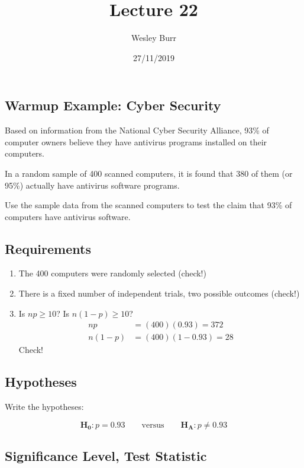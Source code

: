 \documentclass[]{article}
\title{Lecture 22}
\author{Wesley Burr}
\date{27/11/2019}
\providecommand{\tightlist}{%
  \setlength{\itemsep}{0pt}\setlength{\parskip}{0pt}}
\begin{document}
\maketitle

\hypertarget{warmup-example-cyber-security}{%
\subsection{Warmup Example: Cyber
Security}\label{warmup-example-cyber-security}}

Based on information from the National Cyber Security Alliance, 93\% of
computer owners believe they have antivirus programs installed on their
computers.

In a random sample of 400 scanned computers, it is found that 380 of
them (or 95\%) actually have antivirus software programs.

Use the sample data from the scanned computers to test the claim that
93\% of computers have antivirus software.

\hypertarget{requirements}{%
\subsection{Requirements}\label{requirements}}

\begin{enumerate}
\def\labelenumi{\arabic{enumi}.}
\tightlist
\item
  The 400 computers were randomly selected (check!)
\item
  There is a fixed number of independent trials, two possible outcomes
  (check!)
\item
  Is \(np \geq 10\)? Is \(n(1-p) \geq 10\)? \[
  \begin{aligned*}
   np &= (400)(0.93) = 372 \\
  n(1-p) &= (400)(1-0.93) = 28
  \end{aligned*}
  \] Check!
\end{enumerate}

\hypertarget{hypotheses}{%
\subsection{Hypotheses}\label{hypotheses}}

Write the hypotheses:

\[
\mathbf{H_0}: p = 0.93 \qquad \text{versus} \qquad \mathbf{H_A}: p \neq 0.93
\]

\hypertarget{significance-level-test-statistic}{%
\subsection{Significance Level, Test
Statistic}\label{significance-level-test-statistic}}
\end{document}
